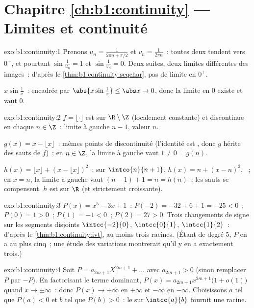 \section*{Chapitre \ref{ch:b1:continuity} --- Limites et continuité}

\begin{solution}{exo:b1:continuity:1}
Prenons $u_n = \frac{1}{2\pi n + \pi/2}$ et $v_n = \frac{1}{2\pi n}$~:
toutes deux tendent vers $0^+$, et pourtant $\sin\frac{1}{u_n} = 1$ et
$\sin\frac{1}{v_n} = 0$. Deux suites, deux limites différentes des
images~: d'après le \cref{thm:b1:continuity:seqchar}, pas de limite en
$0^+$.

$x \sin\frac1x$~: encadrée par $\abs{x\sin\frac1x} \leq \abs x \to 0$,
donc la limite en $0$ existe et vaut $0$.
\end{solution}

\begin{solution}{exo:b1:continuity:2}
$f = \lfloor\cdot\rfloor$ est  sur $\R \setminus \Z$
(localement constante) et discontinue en chaque $n \in \Z$~: limite à
gauche $n - 1$, valeur $n$.

$g(x) = x - \lfloor x\rfloor$~: mêmes points de discontinuité
(l'identité est , donc $g$ hérite des sauts de $f$)~; en $n \in
\Z$, la limite à gauche vaut $1 \neq 0 = g(n)$.

$h(x) = \lfloor x\rfloor + (x - \lfloor x\rfloor)^2$~: sur $\intco{n}{n
+ 1}$, $h(x) = n + (x - n)^2$, ~; en $x = n$, la limite à
gauche vaut $(n-1) + 1 = n = h(n)$~: les sauts se compensent. $h$ est
 sur $\R$ (et strictement croissante).
\end{solution}

\begin{solution}{exo:b1:continuity:3}
$P(x) = x^5 - 3x + 1$~: $P(-2) = -32 + 6 + 1 = -25 < 0$~; $P(0) = 1 >
0$~; $P(1) = -1 < 0$~; $P(2) = 27 > 0$. Trois changements de signe sur
les segments disjoints $\intcc{-2}{0}$, $\intcc{0}{1}$, $\intcc{1}{2}$~:
d'après le \cref{thm:b1:continuity:ivt}, au moins trois racines. (Étant
de degré $5$, $P$ en a au plus cinq~; une étude des variations
montrerait qu'il y en a exactement trois.)
\end{solution}

\begin{solution}{exo:b1:continuity:4}
Soit $P = a_{2m+1}X^{2m+1} + \dots$ avec $a_{2m+1} > 0$ (sinon
remplacer $P$ par $-P$). En factorisant le terme dominant, $P(x) =
a_{2m+1} x^{2m+1}\bigl(1 + o(1)\bigr)$ quand $x \to \pm\infty$~: donc
$P(x) \to +\infty$ en $+\infty$ et $-\infty$ en $-\infty$. Choisissons
$a$ tel que $P(a) < 0$ et $b$ tel que $P(b) > 0$~: le  sur $\intcc{a}{b}$ fournit une racine.
\end{solution}

